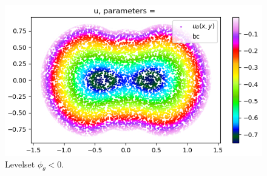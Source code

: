 \documentclass[french]{article}
\begin{document}
	\begin{minipage}{0.33\linewidth}
		\begin{figure}[H]
			\centering
			\includegraphics[width=\linewidth]{"levelset/pumpkin/sol_mask_pumpkin.png"}
			\caption{Levelset $\phi_\theta<0$.}
		\end{figure}
	\end{minipage}
	
\end{document}
